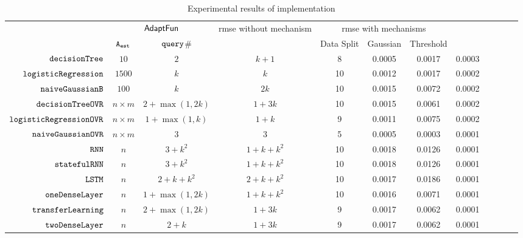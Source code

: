 {\footnotesize
\begin {table}[H]
\vspace{-0.4cm}
    \caption{Experimental results of {\THESYSTEM} implementation}
    \vspace{-0.5cm}
        \label{tb:adapt-imp}
        \begin{center}
        \centering
{\tiny
        \begin{tabular}{| >{\tiny}r | c | c | c | c | c | c | c | c | c | c | c }
         \hline \hline
        \multirow{2}{*}{Program $c$}
         & \multicolumn{2}{c|}{$\textsf{AdaptFun}$}
         & \multirow{2}{*}{rmse without mechanism}
         & \multicolumn{3}{c|}{rmse with mechanisms} & \\ 
         \cline{2-3} \cline{5-7}
         & {${\mathtt{A_{est}}}$ } & {${\tt query}$\# } &  & Data Split & Gaussian & Threshold & \\ 
         \cline{6-8}
         \hline \hline
         $  \mathtt{decisionTree}$ & $10$ &  $2$ & $k+1 $  & 8 & 0.0005 & 0.0017 & 0.0003 \\
         $  \mathtt{logisticRegression}$ & $1500$ &  $k$ & $k$  &  10 & 0.0012 & 0.0017  & 0.0002 \\
         $  \mathtt{naiveGaussianB}$ & $100$ & $k  $ & $ 2k $  &  10 & 0.0015 & 0.0072  & 0.0002  \\
         $  \mathtt{decisionTreeOVR}$ & $n\times m$ &  $2+\max(1,2k)  $ & $1 + 3 k  $  &  10 & 0.0015 & 0.0061  & 0.0002 \\
         $  \mathtt{logisticRegressionOVR}$    & $n\times m$ &  $1+ \max(1, k) $ & $1 + k $  &  9 & 0.0011 & 0.0075  & 0.0002 \\
         $  \mathtt{naiveGaussianOVR}$ & $n\times m$ & $3 $ &   $3$  & 5 & 0.0005 & 0.0003   & 0.0001 \\
         $  \mathtt{RNN}$ & $n$ &   $3 + k^2$ & $1 + k + k^2 $   &  10 & 0.0018 & 0.0126  & 0.0001  \\
         $  \mathtt{statefulRNN}$ & $n$ &   $3 + k^2$ & $1 + k + k^2 $   &  10 & 0.0018 & 0.0126  & 0.0001  \\
         $  \mathtt{LSTM}$ & $n$ &  $ 2 + k +  k^2 $   &  $2 + k + k^2$   &  10 & 0.0017 & 0.0186  & 0.0001  \\
         $  \mathtt{oneDenseLayer}$ & $n$ & $1 + \max(1,2k) $ &  $1 + k + k^2 $  & 10 & 0.0016 & 0.0071  & 0.0001  \\
         {$ \mathtt{transferLearning}$} & $n$ &  $ 2 + \max(1,2k) $ & $1 + 3k  $  &  9 & 0.0017 & 0.0062  & 0.0001  \\
         {$ \mathtt{twoDenseLayer}$} & $n$ &  $ 2 + k $ & $1 + 3k  $  &  9 & 0.0017 & 0.0062  & 0.0001  \\

\end{tabular}}
\end{center}
\end{table}}
